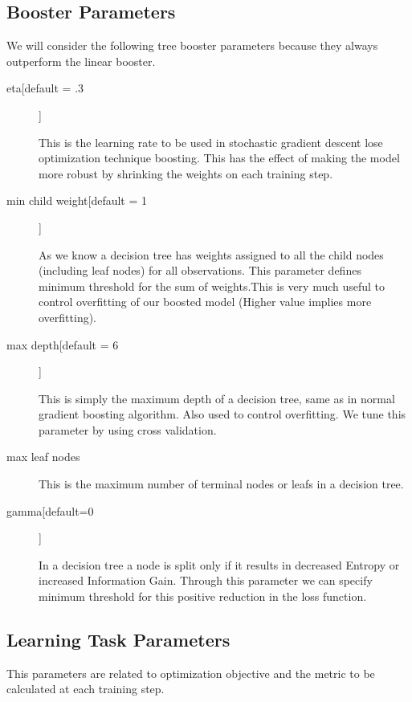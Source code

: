 \subsection{Booster Parameters} 

We will consider the following tree booster parameters because they always
outperform  the linear booster.

\begin{description}
\item[eta[default = .3]]

This is the learning rate to be used in stochastic gradient descent lose
optimization  technique boosting. This has the effect of making the model more
robust by shrinking the  weights on each training step.

\item[min child weight[default = 1]] 

As we know a decision tree has weights assigned to all the child nodes
(including leaf nodes) for all observations. This parameter defines minimum
threshold for the sum of  weights.This is very much useful to control
overfitting of our boosted model  (Higher  value implies more overfitting).

\item[max depth[default = 6]]

This is simply the maximum depth of a decision tree, same as in normal gradient
boosting  algorithm. Also used to control overfitting. We tune this parameter 
by using cross validation.

\item[max leaf nodes]

This is the maximum number of terminal nodes or leafs in a decision tree.

\item[gamma[default=0]]

In a decision tree a node is split only if it results in decreased Entropy or
increased  Information Gain. Through this parameter  we can specify minimum
threshold for this positive  reduction in the loss function.

\end{description}

\subsection{Learning Task Parameters} 

This parameters are related to optimization objective and the metric to be
calculated at each training step.

